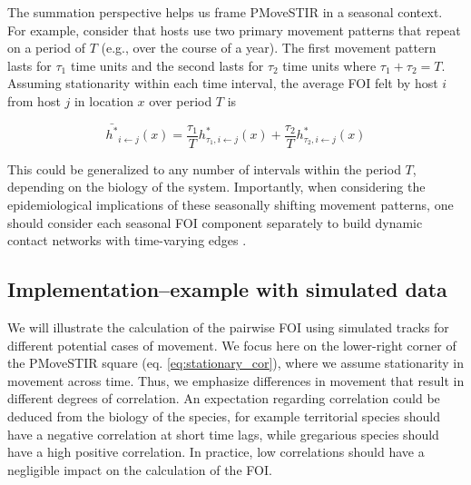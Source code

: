 \documentclass[letterpaper]{article}
\begin{document}
The summation perspective helps us frame PMoveSTIR in a seasonal context.  For example, consider that hosts use two primary movement patterns that repeat on a period of $T$ (e.g., over the course of a year).  The first movement pattern lasts for $\tau_1$ time units and the second lasts for $\tau_2$ time units where $\tau_1 + \tau_2 = T$.  Assuming stationarity within each time interval, the average FOI felt by host $i$ from host $j$ in location $x$ over period $T$ is 

\begin{equation}
\bar{h^*}_{i \leftarrow j}(x) = \frac{\tau_1}{T} h^*_{\tau_1, i \leftarrow j}(x) + \frac{\tau_2}{T} h^*_{\tau_2, i \leftarrow j}(x)
\label{eq:seasonal}
\end{equation}

This could be generalized to any number of intervals within the period $T$, depending on the biology of the system.  Importantly, when considering the epidemiological implications of these seasonally shifting movement patterns, one should consider each seasonal FOI component separately to build dynamic contact networks with time-varying edges \citep{Wilber2022}.

\subsection*{Implementation--example with simulated data}

We will illustrate the calculation of the pairwise FOI using simulated tracks for different potential cases of movement. We focus here on the lower-right corner of the PMoveSTIR square (eq. \ref{eq:stationary_cor}), where we assume stationarity in movement across time. Thus, we emphasize differences in movement that result in different degrees of correlation. An expectation regarding correlation could be deduced from the biology of the species, for example territorial species should have a negative correlation at short time lags, while gregarious species should have a high positive correlation. In practice, low correlations should have a negligible impact on the calculation of the FOI. 
\end{document}
